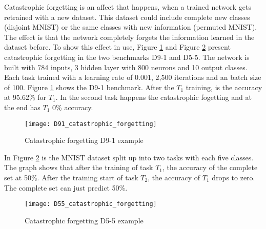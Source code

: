 Catastrophic forgetting is an affect that happens, when a trained network gets retrained with a new dataset.
This dataset could include complete new classes (disjoint MNIST) or the same classes with new information (permuted MNIST).
The effect is that the network completely forgets the information learned in the dataset before.
\newline
To show this effect in use, Figure \ref{fig:catastrophic_forgetting_d91_example} and Figure \ref{fig:catastrophic_forgetting_d55_example} present catastrophic forgetting in the two benchmarks D9-1 and D5-5.
\newline
The network is built with 784 inputs, 3 hidden layer with 800 neurons and 10 output classes.
Each task trained with a learning rate of 0.001, 2,500 iterations and an batch size of 100.
\newline
Figure \ref{fig:catastrophic_forgetting_d91_example} shows the D9-1 benchmark. After the $T_1$ training, is the accuracy at 95.62\% for $T_1$. In the second task happens the catastrophic fogetting and at the end has $T_1$ 0\% accuracy.

\begin{figure}[H]
    \centering
    \texttt{[image: D91\_catastrophic\_forgetting]}
    \caption{Catastrophic forgetting D9-1 example}
    \label{fig:catastrophic_forgetting_d91_example}
\end{figure}

\newpage

In Figure \ref{fig:catastrophic_forgetting_d55_example} is the MNIST dataset split up into two tasks with each five classes.
The graph shows that after the training of task $T_1$, the accuracy of the complete set at 50\%.
After the training start of task $T_2$, the accuracy of $T_1$ drops to zero.
The complete set can just predict 50\%.

\begin{figure}[H]
    \centering
    \texttt{[image: D55\_catastrophic\_forgetting]}
    \caption{Catastrophic forgetting D5-5 example}
    \label{fig:catastrophic_forgetting_d55_example}
\end{figure}

